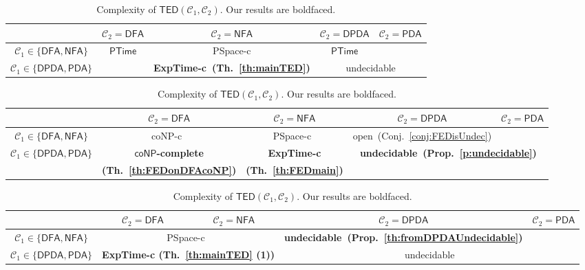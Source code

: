 \documentclass{CSML}
\newcommand{\PTIME}{\textsf{PTime}}
\newcommand{\PSPACE}{\textsf{PSpace}}
\newcommand{\EXPTIME}{\textsf{ExpTime}}
\newcommand{\coNP}{\textsf{coNP}}
\newcommand{\undecidable}{undecidable}
\newcommand{\class}{\mathcal{C}}
\newcommand{\DFA}{\mathsf{DFA}}
\newcommand{\NFA}{\mathsf{NFA}}
\newcommand{\PDA}{\mathsf{PDA}}
\newcommand{\DPDA}{\mathsf{DPDA}}
\newcommand{\TED}{\mathsf{TED}}
\newcommand{\FED}{\mathsf{FED}}
\begin{document}
\begin{table}[t]
\begin{subtable}
\centering\centering
\begin{tabular}{|c|c|c|c|c|}
\hline
& $\class_2 = \DFA$ & $\class_2 = \NFA$  & $\class_2 = \DPDA$ & $\class_2 = \PDA$ \\ 
\hline
$\class_1 \in \{ \DFA, \NFA\}$ & \multirow{2}{*}{$\PTIME$} & \PSPACE-c   & 
 $\PTIME$ &  \\
\cline{1-1}
\cline{3-4}
{$\class_1 \in \{  \DPDA, \PDA\}$} &  & \textbf{\EXPTIME-c~(Th.~\ref{th:mainTED})} & 
\multicolumn{2}{c|}{ {\undecidable}} \\
\hline
\end{tabular}
\caption{Complexity of the language inclusion problem from $\class_1$ to $\class_2$. Our results are boldfaced.
}
\label{tab:complexityOfINC}
\end{subtable}

\begin{subtable}
\centering\centering
\begin{tabular}{|c|c|c|c|c|}
\hline
& $\class_2 = \DFA$ & $\class_2 = \NFA$  & $\class_2 = \DPDA$ & $\class_2 = \PDA$ \\ 
\hline
$\class_1 \in \{ \DFA, \NFA\}$ & \coNP-c~\cite{boundedRiveros} & \PSPACE-c~\cite{boundedRiveros}   & 
 open~(Conj.~\ref{conj:FEDisUndec}) &  \\
\cline{1-4}
\multirow{2}{*}{$\class_1 \in \{  \DPDA, \PDA\}$} &   \textbf{$\coNP$-complete}& \textbf{\EXPTIME-c} & 
\multicolumn{2}{c|}{\multirow{2}{*}{ \textbf{\undecidable~(Prop.~\ref{p:undecidable})}}} \\
&  \textbf{(Th.~\ref{th:FEDonDFAcoNP})}    & \textbf{(Th.~\ref{th:FEDmain})}  &   \multicolumn{2}{c|}{}\\
\hline
\end{tabular}
\caption{Complexity of $\FED(\class_1, \class_2)$. Our results are boldfaced.
}
\label{tab:complexityOfFED}
\end{subtable}

\begin{subtable}
\centering\centering
\begin{tabular}{|c|c|c|c|c|}
\hline
& $\class_2 = \DFA$ & $\class_2 = \NFA$  & $\class_2 = \DPDA$ & $\class_2 = \PDA$ \\ 
\hline
$\class_1 \in \{ \DFA, \NFA\}$ & \multicolumn{2}{c|}{ \PSPACE-c~\cite{riveros}}   & 
\textbf{\undecidable~(Prop.~\ref{th:fromDPDAUndecidable})} & \\
\cline{1-4}
{$\class_1 \in \{  \DPDA, \PDA\}$} &   \multicolumn{2}{c|}{\textbf{\EXPTIME-c (Th.~\ref{th:mainTED} (1))}} & \multicolumn{2}{c|}{\undecidable}   \\
\hline
\end{tabular}
\caption{Complexity of $\TED(\class_1, \class_2)$. Our results are boldfaced.\hspace{3cm}}
\label{tab:complexityOfTED}
\end{subtable}
\end{table}
\end{document}
